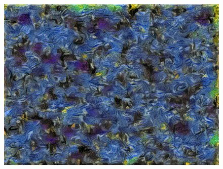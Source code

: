 \documentclass{article}
\begin{document}
\begin{figure}
\begin{minipage}{0.3\linewidth}
    \includegraphics[width=\textwidth]{img/style/block3_conv1}
    \end{minipage}

\medskip


\end{figure}
\end{document}
